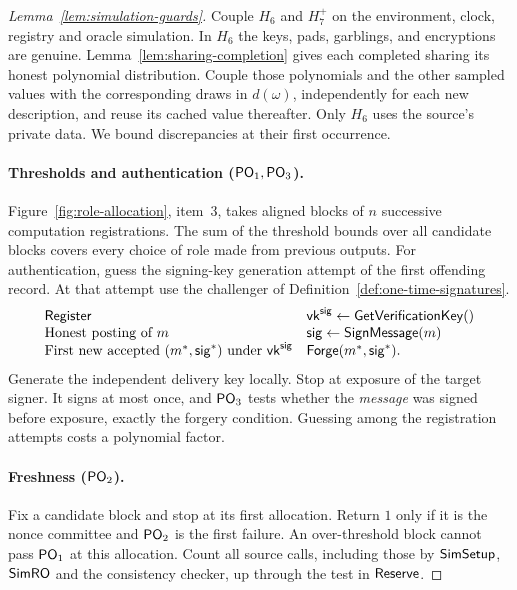 \begin{proof}[Lemma~\ref{lem:simulation-guards}]
Couple $H_6$ and $H_7^+$ on the environment, clock, registry and oracle
simulation.  In $H_6$ the keys, pads, garblings, and encryptions are
genuine.  Lemma~\ref{lem:sharing-completion} gives each completed
sharing its honest polynomial distribution.  Couple those polynomials
and the other sampled values with the corresponding draws in
$d(\omega)$, independently for each new description, and reuse its
cached value thereafter.  Only $H_6$ uses the source's private data.
We bound discrepancies at their first occurrence.

\paragraph{Thresholds and authentication ($\mathsf{PO}_{1},\mathsf{PO}_{3}$).}
Figure~\ref{fig:role-allocation}, item~3, takes aligned blocks of $n$
successive computation registrations.  The sum of the threshold bounds
over all candidate blocks covers every choice of role made from
previous outputs.  For authentication, guess the signing-key
generation attempt of the first offending record. At that attempt use
the challenger of Definition~\ref{def:one-time-signatures}.
\[
\begin{array}{@{}ll@{}}
 \Register & \sigvk\gets\GetVerificationKey()\\
 \text{Honest posting of }m & \sig\gets\SignMessage(m)\\
 \text{First new accepted }(m^*,\sig^*)\text{ under }\sigvk
      & \Forge(m^*,\sig^*).
\end{array}
\]
Generate the independent delivery key locally.  Stop at exposure of the
target signer.  It signs at most once, and $\mathsf{PO}_{3}$ tests whether the
\emph{message} was signed before exposure, exactly the forgery condition.
Guessing among the registration attempts costs a polynomial factor.

\paragraph{Freshness ($\mathsf{PO}_{2}$).}
Fix a candidate block and stop at its first allocation.  Return $1$
only if it is the nonce committee and $\mathsf{PO}_{2}$ is the first failure.
An over-threshold block cannot pass $\mathsf{PO}_{1}$ at this allocation.
Count all source calls, including those by $\mathsf{SimSetup}$, $\mathsf{SimRO}$ and
the consistency checker, up through the test in $\mathsf{Reserve}$.


\end{proof}
